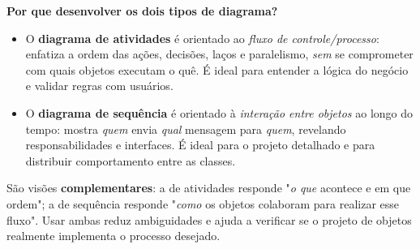 \documentclass[11pt,a4paper]{article}
\begin{document}
\begin{resposta}
\textbf{Por que desenvolver os dois tipos de diagrama?}
\begin{itemize}[nosep]
  \item O \textbf{diagrama de atividades} é orientado ao \emph{fluxo de
        controle/processo}: enfatiza a ordem das ações, decisões, laços e
        paralelismo, \emph{sem} se comprometer com quais objetos executam o quê.
        É ideal para entender a lógica do negócio e validar regras com usuários.
  \item O \textbf{diagrama de sequência} é orientado à \emph{interação entre
        objetos} ao longo do tempo: mostra \emph{quem} envia \emph{qual}
        mensagem para \emph{quem}, revelando responsabilidades e interfaces.
        É ideal para o projeto detalhado e para distribuir comportamento entre
        as classes.
\end{itemize}
São visões \textbf{complementares}: a de atividades responde "\emph{o que} acontece
e em que ordem"; a de sequência responde "\emph{como} os objetos colaboram para
realizar esse fluxo". Usar ambas reduz ambiguidades e ajuda a verificar se o
projeto de objetos realmente implementa o processo desejado.
\end{resposta}

\end{document}
